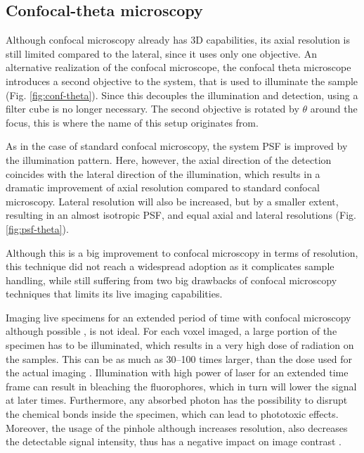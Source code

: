   \subsection{Confocal-theta microscopy}

    Although confocal microscopy already has 3D capabilities, its axial resolution is still limited compared to the lateral, since it uses only one objective. An alternative realization of the confocal microscope, the confocal theta microscope \cite{stelzer_fundamental_1994} introduces a second objective to the system, that is used to illuminate the sample (Fig. \ref{fig:conf-theta}). Since this decouples the illumination and detection, using a filter cube is no longer necessary. The second objective is rotated by $\theta$ around the focus, this is where the name of this setup originates from.

    As in the case of standard confocal microscopy, the system PSF is improved by the illumination pattern. Here, however, the axial direction of the detection coincides with the lateral direction of the illumination, which results in a dramatic improvement of axial resolution compared to standard confocal microscopy. Lateral resolution will also be increased, but by a smaller extent, resulting in an almost isotropic PSF, and equal axial and lateral resolutions (Fig. \ref{fig:psf-theta}). 

    Although this is a big improvement to confocal microscopy in terms of resolution, this technique did not reach a widespread adoption as it complicates sample handling, while still suffering from two big drawbacks of confocal microscopy techniques that limits its live imaging capabilities.

    Imaging live specimens for an extended period of time with confocal microscopy although possible \cite{aldaz_live_2010, maitre_asymmetric_2016}, is not ideal. For each voxel imaged, a large portion of the specimen has to be illuminated, which results in a very high dose of radiation on the samples. This can be as much as 30--100 times larger, than the dose used for the actual imaging \cite{reynaud_light_2008}. Illumination with high power of laser for an extended time frame can result in bleaching the fluorophores, which in turn will lower the signal at later times. Furthermore, any absorbed photon has the possibility to disrupt the chemical bonds inside the specimen, which can lead to phototoxic effects. Moreover, the usage of the pinhole although increases resolution, also decreases the detectable signal intensity, thus has a negative impact on image contrast \cite{stelzer_contrast_1998}.

